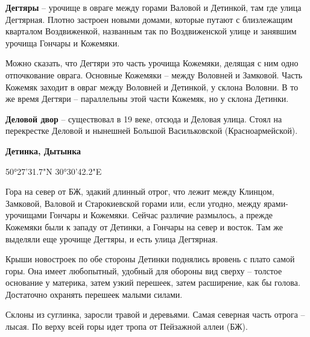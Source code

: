 \medskip

\textbf{Дегтяры} – урочище в овраге между горами Валовой и Детинкой, там где улица Дегтярная. Плотно застроен новыми домами, которые путают с близлежащим кварталом Воздвиженкой, названным так по Воздвиженской улице и занявшим урочища Гончары и Кожемяки. 

Можно сказать, что Дегтяри это часть урочища Кожемяки, делящая с ним одно отпочкование оврага. Основные Кожемяки – между Воловней и Замковой. Часть Кожемяк заходит в овраг между Воловней и Детинкой, у склона Воловни. В то же время Дегтяри – параллельны этой части Кожемяк, но у склона Детинки.\\

\medskip

\textbf{Деловой двор} – существовал в 19 веке, отсюда и Деловая улица. Стоял на перекрестке Деловой и нынешней Большой Васильковской (Красноармейской).\\

\medskip

\textbf{Детинка, Дытынка} 

50°27'31.7"N 30°30'42.2"E


Гора на север от БЖ, эдакий длинный отрог, что лежит между Клинцом, Замковой, Валовой и Старокиевской горами или, если угодно, между ярами-урочищами Гончары и Кожемяки. Сейчас различие размылось, а прежде Кожемяки были к  западу от Детинки, а Гончары на север и восток. Там же выделяли еще урочище Дегтяры, и есть улица Дегтярная.

Крыши новостроек по обе стороны Детинки поднялись вровень с плато самой горы. Она имеет любопытный, удобный для обороны вид сверху – толстое основание у материка, затем узкий перешеек, затем расширение, как бы голова. Достаточно охранять перешеек малыми силами.

Склоны из суглинка, заросли травой и деревьями. Самая северная часть отрога – лысая. По верху всей горы идет тропа от Пейзажной аллеи (БЖ).\\ 

\medskip


